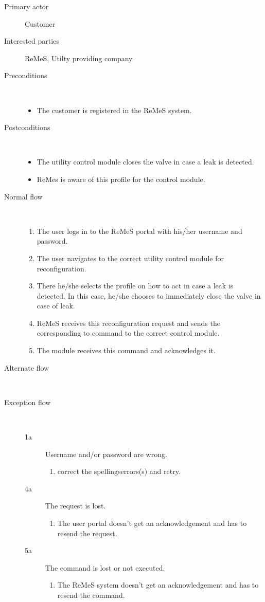 \begin{description}
	\item[Primary actor] Customer
	\item[Interested parties] ReMeS, Utilty providing company
	\item[Preconditions] \ 
	\begin{itemize}
		\item The customer is registered in the ReMeS system.
	\end{itemize}
	\item[Postconditions] \ 
	\begin{itemize}
		\item The utility control module closes the valve in case a leak is detected.
		\item ReMes is aware of this profile for the control module.
	\end{itemize}
	\item[Normal flow] \ 
	\begin{enumerate}
	  	\item The user logs in to the ReMeS portal with his/her username and
	  	password.
	  	\item The user navigates to the correct utility control module for
	  	reconfiguration.
	  	\item There he/she selects the profile on how to act in case a leak is
	  	detected. In this case, he/she chooses to immediately close the valve in
	  	case of leak.
	  	\item ReMeS receives this reconfiguration request and sends the
	  	corresponding to command to the correct control module.
	  	\item The module receives this command and acknowledges it.
	\end{enumerate}
	\item[Alternate flow] \ 
	\begin{description}
		\item
	\end{description}
	\item[Exception flow] \ 
	\begin{description}
		\item[1a] Username and/or password are wrong.
		\begin{enumerate}
		  \item correct the spellingserrors(s) and retry.
		\end{enumerate}
		\item[4a] The request is lost.
		\begin{enumerate}
		  \item The user portal doesn't get an acknowledgement and has to resend the
		  request.
		\end{enumerate}
		\item[5a] The command is lost or not executed.
		\begin{enumerate}
		  \item The ReMeS system doesn't get an acknowledgement and has to resend the
		  command.
		 \end{enumerate}
	\end{description}
\end{description}